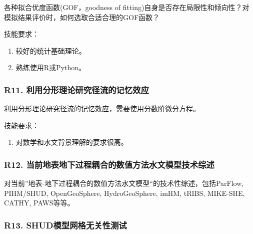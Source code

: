 \documentclass[
]{book}
\providecommand{\tightlist}{%
  \setlength{\itemsep}{0pt}\setlength{\parskip}{0pt}}
\begin{document}
各种拟合优度函数(GOF，goodness of fitting)自身是否存在局限性和倾向性？对模拟结果评价时，如何选取合适合理的GOF函数？

技能要求：

\begin{enumerate}
\def\labelenumi{\arabic{enumi}.}
\tightlist
\item
  较好的统计基础理论。
\item
  熟练使用R或Python。
\end{enumerate}

\hypertarget{r11.-ux5229ux7528ux5206ux5f62ux7406ux8bbaux7814ux7a76ux5f84ux6d41ux7684ux8bb0ux5fc6ux6548ux5e94}{%
\subsubsection{\texorpdfstring{\textbf{R11. 利用分形理论研究径流的记忆效应}}{R11. 利用分形理论研究径流的记忆效应}}\label{r11.-ux5229ux7528ux5206ux5f62ux7406ux8bbaux7814ux7a76ux5f84ux6d41ux7684ux8bb0ux5fc6ux6548ux5e94}}

利用分形理论研究径流的记忆效应，需要使用分数阶微分方程。

技能要求：

\begin{enumerate}
\def\labelenumi{\arabic{enumi}.}
\tightlist
\item
  对数学和水文背景理解的要求很高。
\end{enumerate}

\hypertarget{r12.-ux5f53ux524dux5730ux8868ux5730ux4e0bux8fc7ux7a0bux8026ux5408ux7684ux6570ux503cux65b9ux6cd5ux6c34ux6587ux6a21ux578bux6280ux672fux7efcux8ff0}{%
\subsubsection{\texorpdfstring{\textbf{R12. 当前地表地下过程耦合的数值方法水文模型技术综述}}{R12. 当前地表地下过程耦合的数值方法水文模型技术综述}}\label{r12.-ux5f53ux524dux5730ux8868ux5730ux4e0bux8fc7ux7a0bux8026ux5408ux7684ux6570ux503cux65b9ux6cd5ux6c34ux6587ux6a21ux578bux6280ux672fux7efcux8ff0}}

对当前''地表-地下过程耦合的数值方法水文模型``的技术性综述，包括ParFlow, PIHM/SHUD, OpenGeoSphere, HydroGeoSphere, imHM, tRIBS, MIKE-SHE, CATHY, PAWS等等。

\hypertarget{r13.-shudux6a21ux578bux7f51ux683cux65e0ux5173ux6027ux6d4bux8bd5}{%
\subsubsection{\texorpdfstring{\textbf{R13. SHUD模型网格无关性测试}}{R13. SHUD模型网格无关性测试}}\label{r13.-shudux6a21ux578bux7f51ux683cux65e0ux5173ux6027ux6d4bux8bd5}}
\end{document}
